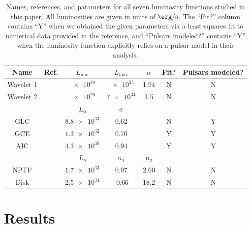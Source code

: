 \documentclass[letter,11pt]{article}
\begin{document}
\begin{table}
  \centering
  \begin{tabular}{|cc|ccc|cc|}
    \hline
    Name & Ref. & $L_\text{min}$ & $L_\text{max}$ & $\alpha$ &  Fit? & Pulsars modeled?\\ \hline
    Wavelet 1 & \cite{Zhong:2019ycb} & $\num{e29}$ & $\num{e35}$ & 1.94 & N & N \\
    Wavelet 2 & \cite{Bartels:2015aea} & $\num{e29}$ & $\num{7e34}$ & 1.5 & N & N \\ \hline
    & & $L_0$ & $\sigma$ & & & \\
    GLC & \cite{Hooper16} & $\num{8.8e33}$ & 0.62 &  & N & Y \\
    GCE & \cite{Ploeg:2020jeh} & $\num{1.3e32}$ & 0.70 & & Y & Y \\
    AIC & \cite{Gautam:2021wqn} & $\num{4.3e30}$ & 0.94 & & Y & Y \\ \hline
    & & $L_b$ & $n_1$ & $n_2$ & & \\
    NPTF & \cite{Lee:2015fea} & $\num{1.7e33}$ & 0.97 & 2.60 & N & N \\
    Disk & \cite{Bartels:2018xom} & $\num{2.5e34}$ & -0.66 & 18.2 & N & N \\ \hline
  \end{tabular}
  \caption{Names, references, and parameters for all seven luminosity functions studied in this paper. All luminosities are given in units of $\SI{}{\erg\per\second}$. The ``Fit?'' column contains ``Y'' when we obtained the given parameters via a least-squares fit to numerical data provided in the reference, and ``Pulsars modeled?'' contains ``Y'' when the luminosity function explicitly relies on a pulsar model in their analysis.}
  \label{tab:lf-params}
\end{table}







\section{Results}
\label{sec:results}
\end{document}
